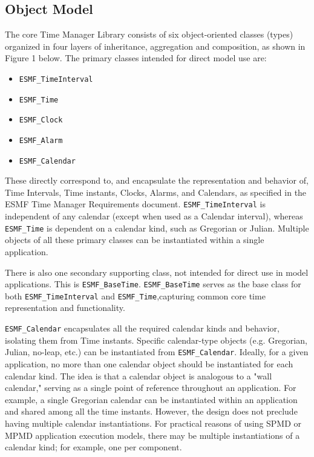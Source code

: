
\subsection{Object Model}

The core Time Manager Library consists of six object-oriented classes (types)
organized in four layers of inheritance, aggregation and composition,
as shown in Figure 1 below.  The primary classes intended for
direct model use are:

\begin{itemize}
\item {\tt ESMF\_TimeInterval}
\item {\tt ESMF\_Time}
\item {\tt ESMF\_Clock}
\item {\tt ESMF\_Alarm}
\item {\tt ESMF\_Calendar}
\end{itemize}

These directly correspond to, and encapsulate the representation and
behavior of, Time Intervals, Time instants, Clocks, Alarms, and Calendars,
as specified in the ESMF Time Manager Requirements document.
{\tt ESMF\_TimeInterval} is independent of any calendar (except when used
as a Calendar interval), whereas {\tt ESMF\_Time} is dependent on a calendar
kind, such as Gregorian or Julian.  Multiple objects of all these primary
classes can be instantiated within a single application.

There is also one secondary supporting class, not intended for direct
use in model applications.  This is {\tt ESMF\_BaseTime}.  {\tt ESMF\_BaseTime}
serves as the base class for both {\tt ESMF\_TimeInterval} and
{\tt ESMF\_Time},capturing common core time representation and functionality.

{\tt ESMF\_Calendar} encapsulates all the required calendar kinds and behavior,
isolating them from Time instants.  Specific calendar-type objects (e.g.
Gregorian, Julian, no-leap, etc.) can be instantiated from {\tt ESMF\_Calendar}.
Ideally, for a given application, no more than one calendar
object should be instantiated for each calendar kind.  The idea is that
a calendar object is analogous to a "wall calendar," serving as a single
point of reference throughout an application.  For example, a single
Gregorian calendar can be instantiated within an application and shared
among all the time instants.  However, the design does not preclude having
multiple calendar instantiations.  For practical reasons of using SPMD or
MPMD application execution models, there may be multiple instantiations
of a calendar kind; for example, one per component.

